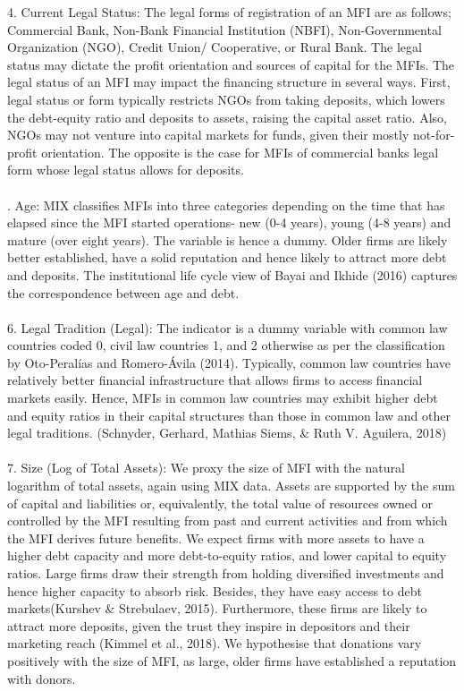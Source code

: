 \documentclass[a4paper, nobind]{templates/ociamthesis}
\begin{document}
\begin{longtabu}
4. Current Legal Status: The legal forms of registration of an MFI are as follows; Commercial Bank, Non-Bank Financial Institution (NBFI), Non-Governmental Organization (NGO), Credit Union/ Cooperative, or Rural Bank. The legal status may dictate the profit orientation and sources of capital for the MFIs. The legal status of an MFI may impact the financing structure in several ways. First, legal status or form typically restricts NGOs from taking deposits, which lowers the debt-equity ratio and deposits to assets, raising the capital asset ratio. Also, NGOs may not venture into capital markets for funds, given their mostly not-for-profit orientation. The opposite is the case for MFIs of commercial banks legal form whose legal status allows for deposits.\\
\\
.  Age: MIX classifies MFIs into three categories depending on the time that has elapsed since the MFI started operations- new (0-4 years), young (4-8 years) and mature (over eight years). The variable is hence a dummy. Older firms are likely better established, have a solid reputation and hence likely to attract more debt and deposits. The institutional life cycle view of Bayai and Ikhide (2016) captures the correspondence between age and debt.\\
\\
6. Legal Tradition (Legal): The indicator is a dummy variable with common law countries coded 0, civil law countries 1, and 2 otherwise as per the classification by Oto-Peralías and Romero-Ávila (2014). Typically, common law countries have relatively better financial infrastructure that allows firms to access financial markets easily. Hence, MFIs in common law countries may exhibit higher debt and equity ratios in their capital structures than those in common law and other legal traditions. (Schnyder, Gerhard, Mathias Siems, \& Ruth V. Aguilera, 2018)\\
\\
7. Size (Log of Total Assets): We proxy the size of MFI with the natural logarithm of total assets, again using MIX data. Assets are supported by the sum of capital and liabilities or, equivalently, the total value of resources owned or controlled by the MFI resulting from past and current activities and from which the MFI derives future benefits. We expect firms with more assets to have a higher debt capacity and more debt-to-equity ratios, and lower capital to equity ratios. Large firms draw their strength from holding diversified investments and hence higher capacity to absorb risk. Besides, they have easy access to debt markets(Kurshev \& Strebulaev, 2015). Furthermore, these firms are likely to attract more deposits, given the trust they inspire in depositors and their marketing reach (Kimmel et al., 2018). We hypothesise that donations vary positively with the size of MFI, as large, older firms have established a reputation with donors.\\

\end{longtabu}
\end{document}
